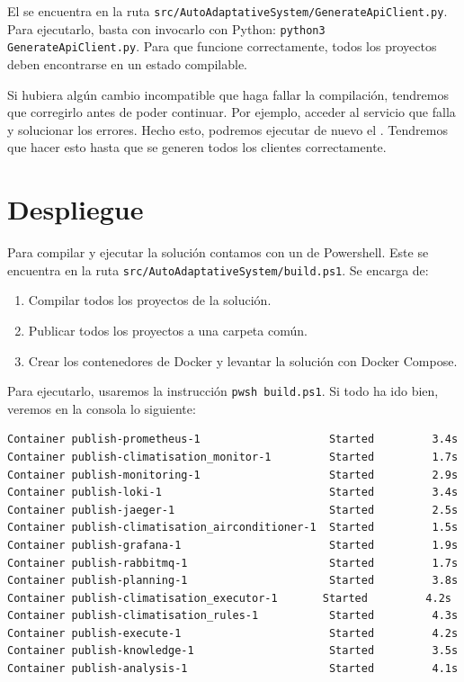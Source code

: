 El  se encuentra en la ruta \texttt{src/AutoAdaptativeSystem/GenerateApiClient.py}. Para ejecutarlo, basta con invocarlo con Python: \texttt{python3 GenerateApiClient.py}. Para que funcione correctamente, todos los proyectos deben encontrarse en un estado compilable.

Si hubiera algún cambio incompatible que haga fallar la compilación, tendremos que corregirlo antes de poder continuar. Por ejemplo, acceder al servicio que falla y solucionar los errores. Hecho esto, podremos ejecutar de nuevo el . Tendremos que hacer esto hasta que se generen todos los clientes correctamente.

\section{Despliegue}

Para compilar y ejecutar la solución contamos con un  de Powershell. Este se encuentra en la ruta \texttt{src/AutoAdaptativeSystem/build.ps1}. Se encarga de:
\begin{enumerate}
  \item Compilar todos los proyectos de la solución.
  \item Publicar todos los proyectos a una carpeta común.
  \item Crear los contenedores de Docker y levantar la solución con Docker Compose.
\end{enumerate}

Para ejecutarlo, usaremos la instrucción \texttt{pwsh build.ps1}. Si todo ha ido bien, veremos en la consola lo siguiente:

\begin{verbatim}
Container publish-prometheus-1                    Started         3.4s
Container publish-climatisation_monitor-1         Started         1.7s
Container publish-monitoring-1                    Started         2.9s
Container publish-loki-1                          Started         3.4s
Container publish-jaeger-1                        Started         2.5s
Container publish-climatisation_airconditioner-1  Started         1.5s
Container publish-grafana-1                       Started         1.9s
Container publish-rabbitmq-1                      Started         1.7s
Container publish-planning-1                      Started         3.8s
Container publish-climatisation_executor-1       Started         4.2s
Container publish-climatisation_rules-1           Started         4.3s
Container publish-execute-1                       Started         4.2s
Container publish-knowledge-1                     Started         3.5s
Container publish-analysis-1                      Started         4.1s
\end{verbatim}


